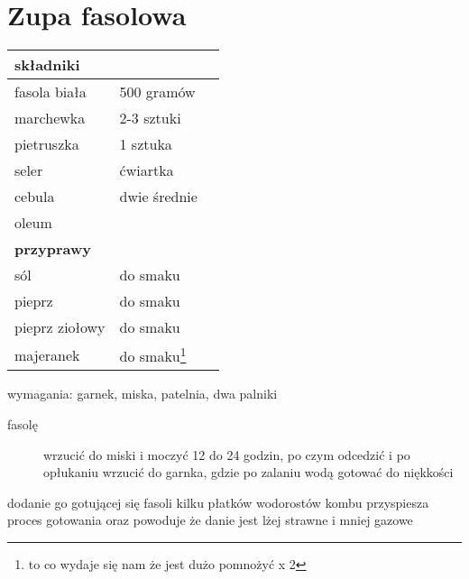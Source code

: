 \section{Zupa fasolowa}
\begin{table}[h]
\begin{tabular}{l l l}
\toprule
\textbf{składniki} & \\
\midrule
fasola biała & 500 gramów \\
marchewka & 2-3 sztuki \\
pietruszka & 1 sztuka \\
seler & ćwiartka \\
cebula & dwie średnie \\
oleum & \\
\midrule
\textbf{przyprawy}&\\
\midrule
sól & do smaku \\
pieprz & do smaku \\
pieprz ziołowy &do smaku \\
majeranek & do smaku\footnote{to co wydaje się nam że jest dużo pomnożyć x 2} \\
\bottomrule
\end{tabular}
\end{table}
\begin{exercise} wymagania: garnek, miska, patelnia, dwa palniki
\begin{description}
\item[fasolę] wrzucić do miski i moczyć 12 do 24 godzin, po czym odcedzić i po opłukaniu wrzucić do garnka, gdzie po zalaniu wodą gotować do niękkości
\end{description}
\end{exercise}
\begin{corollary}
dodanie go gotującej się fasoli kilku płatków wodorostów kombu przyspiesza proces gotowania oraz powoduje że danie jest lżej strawne i mniej gazowe
\end{corollary}
